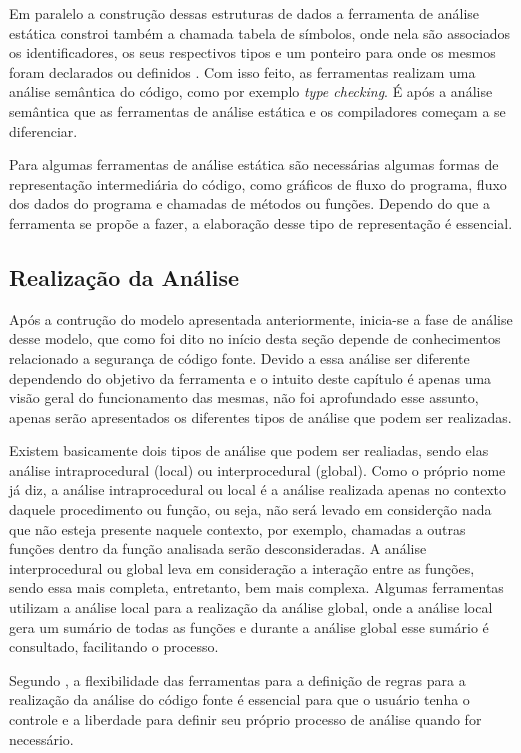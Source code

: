 Em paralelo a construção dessas estruturas de dados a ferramenta de análise
estática constroi também a chamada tabela de símbolos, onde nela são associados
os identificadores, os seus respectivos tipos e um ponteiro para onde os mesmos
foram declarados ou definidos \cite{chess&west2007}. Com isso feito, as
ferramentas realizam uma análise semântica do código, como por exemplo
\textit{type checking}. É após a análise semântica que as ferramentas de análise
estática e os compiladores começam a se diferenciar.

Para algumas ferramentas de análise estática são necessárias algumas formas de
representação intermediária do código, como gráficos de fluxo do programa, fluxo
dos dados do programa e chamadas de métodos ou funções. Dependo do que a
ferramenta se propõe a fazer, a elaboração desse tipo de representação é
essencial.

\subsection{Realização da Análise}

Após a contrução do modelo apresentada anteriormente, inicia-se a fase de
análise desse modelo, que como foi dito no início desta seção depende de
conhecimentos relacionado a segurança de código fonte. Devido a essa análise ser
diferente dependendo do objetivo da ferramenta e o intuito deste capítulo é
apenas uma visão geral do funcionamento das mesmas, não foi aprofundado esse
assunto, apenas serão apresentados os diferentes tipos de análise que podem ser
realizadas.

Existem basicamente dois tipos de análise que podem ser realiadas, sendo elas
análise intraprocedural (local) ou interprocedural (global). Como o próprio nome
já diz, a análise intraprocedural ou local é a análise realizada apenas no contexto
daquele procedimento ou função, ou seja, não será levado em considerção nada que
não esteja presente naquele contexto, por exemplo, chamadas a outras funções
dentro da função analisada serão desconsideradas. A análise interprocedural ou
global leva em consideração a interação entre as funções, sendo essa mais
completa, entretanto, bem mais complexa. Algumas ferramentas utilizam a análise
local para a realização da análise global, onde a análise local gera um sumário
de todas as funções e durante a análise global esse sumário é consultado,
facilitando o processo.

Segundo , a flexibilidade das ferramentas para a
definição de regras para a realização da análise do código fonte é essencial
para que o usuário tenha o controle e a liberdade para definir seu próprio
processo de análise quando for necessário.


